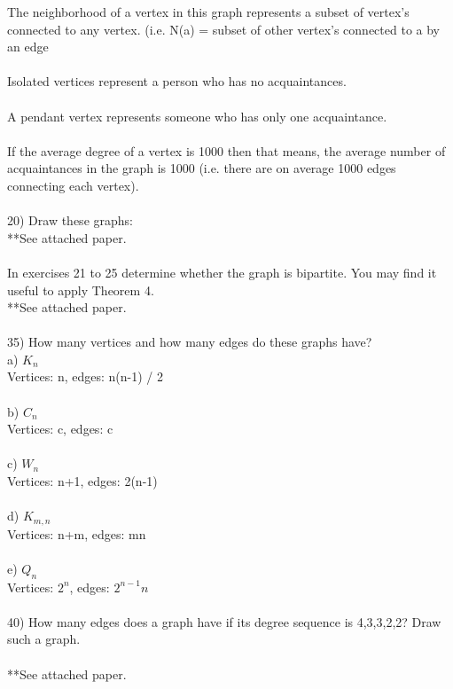 \documentclass{article}
\begin{document}
\begin{flushleft}
\setlength\parindent{24pt}The neighborhood of a vertex in this graph represents a subset of vertex's connected to any vertex.  (i.e. N(a) = { subset of other vertex's connected to a by an edge } \\
~\\
\setlength\parindent{24pt}Isolated vertices represent a person who has no acquaintances. \\
~\\
\setlength\parindent{24pt}A pendant vertex represents someone who has only one acquaintance.  \\
~\\
\setlength\parindent{24pt}If the average degree of a vertex is 1000 then that means, the average number of acquaintances in the graph is 1000 (i.e. there are on average 1000 edges connecting each vertex). \\
~\\
\setlength\parindent{0pt}20) Draw these graphs: \\
**See attached paper. \\
~\\
\setlength\parindent{24pt} In exercises 21 to 25 determine whether the graph is bipartite.  You may find it useful to apply Theorem 4. \\
**See attached paper. \\
~\\
\setlength\parindent{0pt}35) How many vertices and how many edges do these graphs have? \\
\setlength\parindent{24pt}a) $K_n$ \\
\setlength\parindent{24pt}Vertices: n, edges: n(n-1) / 2 \\
~\\
\setlength\parindent{24pt}b) $C_n$ \\
\setlength\parindent{24pt}Vertices: c, edges: c \\
~\\
\setlength\parindent{24pt}c) $W_n$ \\
\setlength\parindent{24pt}Vertices: n+1, edges: 2(n-1) \\
~\\
\setlength\parindent{24pt}d) $K_{m,n}$ \\
\setlength\parindent{24pt} Vertices: n+m, edges: mn \\
~\\
\setlength\parindent{24pt}e) $Q_n$ \\
\setlength\parindent{24pt}Vertices: $2^n$, edges: $2^{n-1}n$ \\
~\\
\setlength\parindent{0pt}40) How many edges does a graph have if its degree sequence is 4,3,3,2,2? Draw such a graph. \\
~\\
**See attached paper. \\


\end{flushleft}
\end{document}

